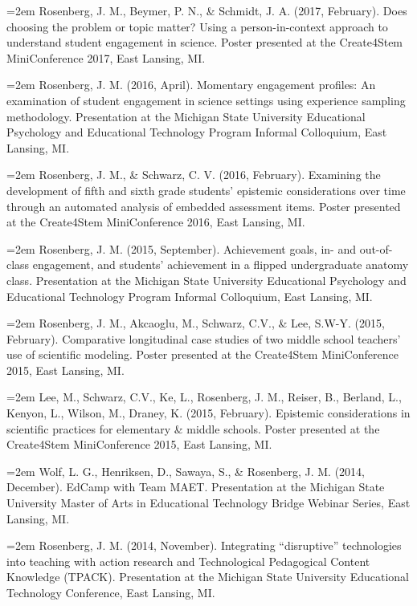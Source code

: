 \documentclass[14,]{article}
\begin{document}
\hangindent=2em Rosenberg, J. M., Beymer, P. N., \& Schmidt, J. A.
(2017, February). Does choosing the problem or topic matter? Using a
person-in-context approach to understand student engagement in science.
Poster presented at the Create4Stem MiniConference 2017, East Lansing,
MI.

\hangindent=2em Rosenberg, J. M. (2016, April). Momentary engagement
profiles: An examination of student engagement in science settings using
experience sampling methodology. Presentation at the Michigan State
University Educational Psychology and Educational Technology Program
Informal Colloquium, East Lansing, MI.

\hangindent=2em Rosenberg, J. M., \& Schwarz, C. V. (2016, February).
Examining the development of fifth and sixth grade students' epistemic
considerations over time through an automated analysis of embedded
assessment items. Poster presented at the Create4Stem MiniConference
2016, East Lansing, MI.

\hangindent=2em Rosenberg, J. M. (2015, September). Achievement goals,
in- and out-of-class engagement, and students' achievement in a flipped
undergraduate anatomy class. Presentation at the Michigan State
University Educational Psychology and Educational Technology Program
Informal Colloquium, East Lansing, MI.

\hangindent=2em Rosenberg, J. M., Akcaoglu, M., Schwarz, C.V., \& Lee,
S.W-Y. (2015, February). Comparative longitudinal case studies of two
middle school teachers' use of scientific modeling. Poster presented at
the Create4Stem MiniConference 2015, East Lansing, MI.

\hangindent=2em Lee, M., Schwarz, C.V., Ke, L., Rosenberg, J. M.,
Reiser, B., Berland, L., Kenyon, L., Wilson, M., Draney, K. (2015,
February). Epistemic considerations in scientific practices for
elementary \& middle schools. Poster presented at the Create4Stem
MiniConference 2015, East Lansing, MI.

\hangindent=2em Wolf, L. G., Henriksen, D., Sawaya, S., \& Rosenberg, J.
M. (2014, December). EdCamp with Team MAET. Presentation at the Michigan
State University Master of Arts in Educational Technology Bridge Webinar
Series, East Lansing, MI.

\hangindent=2em Rosenberg, J. M. (2014, November). Integrating
``disruptive'' technologies into teaching with action research and
Technological Pedagogical Content Knowledge (TPACK). Presentation at the
Michigan State University Educational Technology Conference, East
Lansing, MI.
\end{document}
